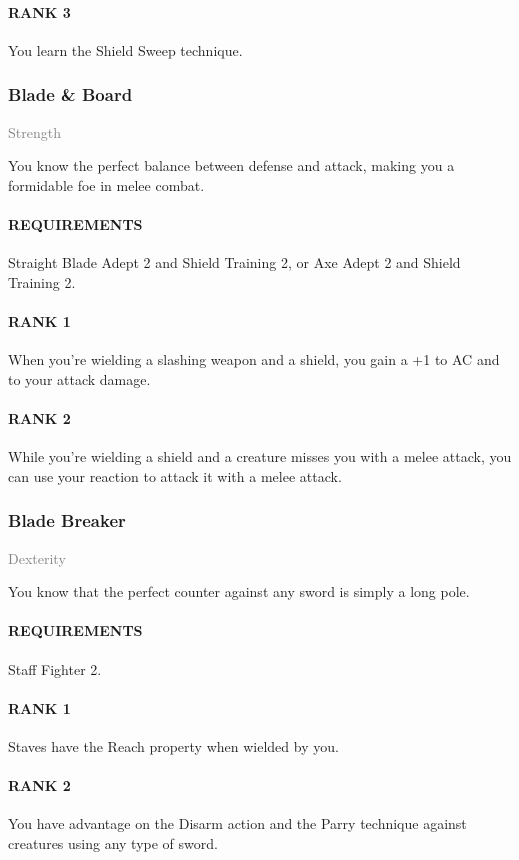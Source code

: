 \paragraph{RANK 3} You learn the Shield Sweep technique.

\subsubsection{Blade \& Board} \label{feat::bladeandboard}
\small{\textcolor{gray}{Strength}}

\normalsize
You know the perfect balance between defense and attack, making you a formidable foe in melee combat.
\paragraph{REQUIREMENTS} Straight Blade Adept 2 and Shield Training 2, or Axe Adept 2 and Shield Training 2.
\paragraph{RANK 1} When you're wielding a slashing weapon and a shield, you gain a +1 to AC and to your attack damage.
\paragraph{RANK 2} While you're wielding a shield and a creature misses you with a melee attack, you can use your reaction to attack it with a melee attack.

\subsubsection{Blade Breaker} \label{feat::bladebreaker}
\small{\textcolor{gray}{Dexterity}}

\normalsize
You know that the perfect counter against any sword is simply a long pole.
\paragraph{REQUIREMENTS} Staff Fighter 2.
\paragraph{RANK 1} Staves have the Reach property when wielded by you.
\paragraph{RANK 2} You have advantage on the Disarm action and the Parry technique against creatures using any type of sword.
